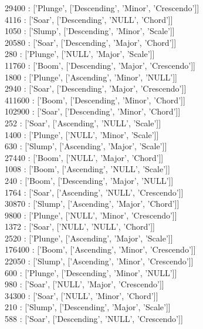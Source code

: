 {29400   :  ['Plunge', ['Descending', 'Minor', 'Crescendo']]\\
4116    :  ['Soar', ['Descending', 'NULL', 'Chord']]\\
1050    :  ['Slump', ['Descending', 'Minor', 'Scale']]\\
20580   :  ['Soar', ['Descending', 'Major', 'Chord']]\\
280     :  ['Plunge', ['NULL', 'Major', 'Scale']]\\
11760   :  ['Boom', ['Descending', 'Major', 'Crescendo']]\\
1800    :  ['Plunge', ['Ascending', 'Minor', 'NULL']]\\
2940    :  ['Soar', ['Descending', 'Major', 'Crescendo']]\\
411600  :  ['Boom', ['Descending', 'Minor', 'Chord']]\\
102900  :  ['Soar', ['Descending', 'Minor', 'Chord']]\\
252     :  ['Soar', ['Ascending', 'NULL', 'Scale']]\\
1400    :  ['Plunge', ['NULL', 'Minor', 'Scale']]\\
630     :  ['Slump', ['Ascending', 'Major', 'Scale']]\\
27440   :  ['Boom', ['NULL', 'Major', 'Chord']]\\
1008    :  ['Boom', ['Ascending', 'NULL', 'Scale']]\\
240     :  ['Boom', ['Descending', 'Major', 'NULL']]\\
1764    :  ['Soar', ['Ascending', 'NULL', 'Crescendo']]\\
30870   :  ['Slump', ['Ascending', 'Major', 'Chord']]\\
9800    :  ['Plunge', ['NULL', 'Minor', 'Crescendo']]\\
1372    :  ['Soar', ['NULL', 'NULL', 'Chord']]\\
2520    :  ['Plunge', ['Ascending', 'Major', 'Scale']]\\
176400  :  ['Boom', ['Ascending', 'Minor', 'Crescendo']]\\
22050   :  ['Slump', ['Ascending', 'Minor', 'Crescendo']]\\
600     :  ['Plunge', ['Descending', 'Minor', 'NULL']]\\
980     :  ['Soar', ['NULL', 'Major', 'Crescendo']]\\
34300   :  ['Soar', ['NULL', 'Minor', 'Chord']]\\
210     :  ['Slump', ['Descending', 'Major', 'Scale']]\\
588     :  ['Soar', ['Descending', 'NULL', 'Crescendo']]\\
}
